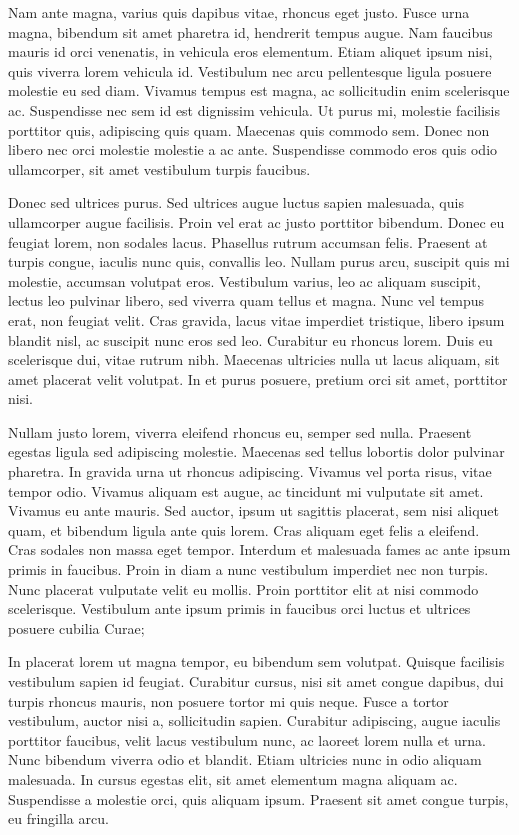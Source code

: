 Nam ante magna, varius quis dapibus vitae, rhoncus eget justo. Fusce urna magna, bibendum sit amet pharetra id, hendrerit tempus augue. Nam faucibus mauris id orci venenatis, in vehicula eros elementum. Etiam aliquet ipsum nisi, quis viverra lorem vehicula id. Vestibulum nec arcu pellentesque ligula posuere molestie eu sed diam. Vivamus tempus est magna, ac sollicitudin enim scelerisque ac. Suspendisse nec sem id est dignissim vehicula. Ut purus mi, molestie facilisis porttitor quis, adipiscing quis quam. Maecenas quis commodo sem. Donec non libero nec orci molestie molestie a ac ante. Suspendisse commodo eros quis odio ullamcorper, sit amet vestibulum turpis faucibus.

Donec sed ultrices purus. Sed ultrices augue luctus sapien malesuada, quis ullamcorper augue facilisis. Proin vel erat ac justo porttitor bibendum. Donec eu feugiat lorem, non sodales lacus. Phasellus rutrum accumsan felis. Praesent at turpis congue, iaculis nunc quis, convallis leo. Nullam purus arcu, suscipit quis mi molestie, accumsan volutpat eros. Vestibulum varius, leo ac aliquam suscipit, lectus leo pulvinar libero, sed viverra quam tellus et magna. Nunc vel tempus erat, non feugiat velit. Cras gravida, lacus vitae imperdiet tristique, libero ipsum blandit nisl, ac suscipit nunc eros sed leo. Curabitur eu rhoncus lorem. Duis eu scelerisque dui, vitae rutrum nibh. Maecenas ultricies nulla ut lacus aliquam, sit amet placerat velit volutpat. In et purus posuere, pretium orci sit amet, porttitor nisi.

Nullam justo lorem, viverra eleifend rhoncus eu, semper sed nulla. Praesent egestas ligula sed adipiscing molestie. Maecenas sed tellus lobortis dolor pulvinar pharetra. In gravida urna ut rhoncus adipiscing. Vivamus vel porta risus, vitae tempor odio. Vivamus aliquam est augue, ac tincidunt mi vulputate sit amet. Vivamus eu ante mauris. Sed auctor, ipsum ut sagittis placerat, sem nisi aliquet quam, et bibendum ligula ante quis lorem. Cras aliquam eget felis a eleifend. Cras sodales non massa eget tempor. Interdum et malesuada fames ac ante ipsum primis in faucibus. Proin in diam a nunc vestibulum imperdiet nec non turpis. Nunc placerat vulputate velit eu mollis. Proin porttitor elit at nisi commodo scelerisque. Vestibulum ante ipsum primis in faucibus orci luctus et ultrices posuere cubilia Curae;

In placerat lorem ut magna tempor, eu bibendum sem volutpat. Quisque facilisis vestibulum sapien id feugiat. Curabitur cursus, nisi sit amet congue dapibus, dui turpis rhoncus mauris, non posuere tortor mi quis neque. Fusce a tortor vestibulum, auctor nisi a, sollicitudin sapien. Curabitur adipiscing, augue iaculis porttitor faucibus, velit lacus vestibulum nunc, ac laoreet lorem nulla et urna. Nunc bibendum viverra odio et blandit. Etiam ultricies nunc in odio aliquam malesuada. In cursus egestas elit, sit amet elementum magna aliquam ac. Suspendisse a molestie orci, quis aliquam ipsum. Praesent sit amet congue turpis, eu fringilla arcu.

